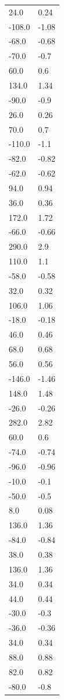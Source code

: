 \begin{longtable}{ll}
24.0 & 0.24 \\
-108.0 & -1.08 \\
-68.0 & -0.68 \\
-70.0 & -0.7 \\
60.0 & 0.6 \\
134.0 & 1.34 \\
-90.0 & -0.9 \\
26.0 & 0.26 \\
70.0 & 0.7 \\
-110.0 & -1.1 \\
-82.0 & -0.82 \\
-62.0 & -0.62 \\
94.0 & 0.94 \\
36.0 & 0.36 \\
172.0 & 1.72 \\
-66.0 & -0.66 \\
290.0 & 2.9 \\
110.0 & 1.1 \\
-58.0 & -0.58 \\
32.0 & 0.32 \\
106.0 & 1.06 \\
-18.0 & -0.18 \\
46.0 & 0.46 \\
68.0 & 0.68 \\
56.0 & 0.56 \\
-146.0 & -1.46 \\
148.0 & 1.48 \\
-26.0 & -0.26 \\
282.0 & 2.82 \\
60.0 & 0.6 \\
-74.0 & -0.74 \\
-96.0 & -0.96 \\
-10.0 & -0.1 \\
-50.0 & -0.5 \\
8.0 & 0.08 \\
136.0 & 1.36 \\
-84.0 & -0.84 \\
38.0 & 0.38 \\
136.0 & 1.36 \\
34.0 & 0.34 \\
44.0 & 0.44 \\
-30.0 & -0.3 \\
-36.0 & -0.36 \\
34.0 & 0.34 \\
88.0 & 0.88 \\
82.0 & 0.82 \\
-80.0 & -0.8 \\

\end{longtable}
